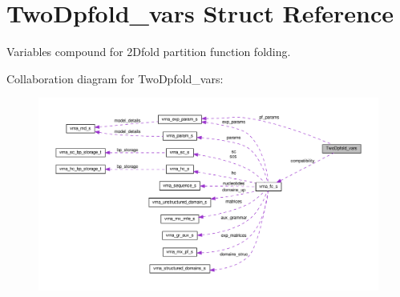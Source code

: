 \hypertarget{structTwoDpfold__vars}{}\section{Two\+Dpfold\+\_\+vars Struct Reference}
\label{structTwoDpfold__vars}


Variables compound for 2\+Dfold partition function folding.  




Collaboration diagram for Two\+Dpfold\+\_\+vars\+:
\nopagebreak
\begin{figure}[H]
\begin{center}
\leavevmode
\includegraphics[width=350pt]{structTwoDpfold__vars__coll__graph}
\end{center}
\end{figure}
